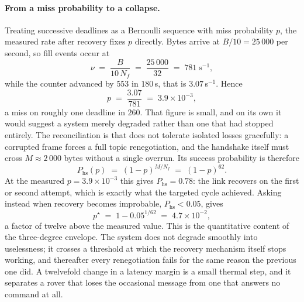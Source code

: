 \paragraph{From a miss probability to a collapse.}
Treating successive deadlines as a Bernoulli sequence with miss probability
$p$, the measured rate after recovery fixes $p$ directly. Bytes arrive at
$B/10 = 25\,000$ per second, so fill events occur at
\begin{equation}
\nu \;=\; \frac{B}{10\,N_f} \;=\; \frac{25\,000}{32}
      \;=\; 781\;\text{s}^{-1},
\label{eq:fillrate}
\end{equation}
while the counter advanced by $553$ in $180$\,s, that is $3.07$\,s$^{-1}$.
Hence
\begin{equation}
p \;=\; \frac{3.07}{781} \;=\; 3.9\times10^{-3},
\label{eq:missprob}
\end{equation}
a miss on roughly one deadline in $260$. That figure is small, and on its own
it would suggest a system merely degraded rather than one that had stopped
entirely. The reconciliation is that  does not tolerate
isolated losses gracefully: a corrupted frame forces a full topic
renegotiation, and the handshake itself must cross $M \approx 2\,000$ bytes
without a single overrun. Its success probability is therefore
\begin{equation}
P_{\mathrm{hs}}(p) \;=\; (1-p)^{M/N_f} \;=\; (1-p)^{62}.
\label{eq:handshake}
\end{equation}
At the measured $p = 3.9\times10^{-3}$ this gives $P_{\mathrm{hs}} = 0.78$:
the link recovers on the first or second attempt, which is exactly what the
targeted cycle achieved. Asking instead when recovery becomes improbable,
$P_{\mathrm{hs}} < 0.05$, gives
\begin{equation}
p^{\star} \;=\; 1 - 0.05^{1/62} \;=\; 4.7\times10^{-2},
\label{eq:pcrit}
\end{equation}
a factor of twelve above the measured value. This is the quantitative content
of the three-degree envelope. The system does not degrade smoothly into
uselessness; it crosses a threshold at which the recovery mechanism itself
stops working, and thereafter every renegotiation fails for the same reason
the previous one did. A twelvefold change in a latency margin is a small
thermal step, and it separates a rover that loses the occasional message from
one that answers no command at all.

